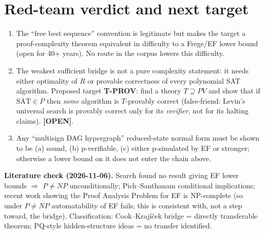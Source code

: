 \documentclass[11pt]{article}
\newcommand{\status}[1]{\textbf{[#1]}}
\newcommand{\SAT}{\mathrm{SAT}}
\begin{document}
\section{Red-team verdict and next target}
\begin{enumerate}
\item The ``free best sequence'' convention is legitimate but makes the target a proof-complexity theorem equivalent in difficulty to a Frege/EF lower bound (open for 40+ years). No route in the corpus lowers this difficulty.
\item The weakest sufficient bridge is not a pure complexity statement: it needs either optimality of $R$ or provable correctness of every polynomial SAT algorithm. Proposed target \textbf{T-PROV}: find a theory $T\supseteq PV$ and show that if $\SAT\in P$ then \emph{some} algorithm is $T$-provably correct (false-friend: Levin's universal search is provably correct only for its \emph{verifier}, not for its halting claims). \status{OPEN}.
\item Any ``multisign DAG hypergraph'' reduced-state normal form must be shown to be (a) sound, (b) p-verifiable, (c) either p-simulated by EF or stronger; otherwise a lower bound on it does not enter the chain above.
\end{enumerate}
\textbf{Literature check (2026-11-06).} Search found no result giving EF lower bounds $\Rightarrow$ $P\ne NP$ unconditionally; Pich--Santhanam conditional implications; recent work showing the Proof Analysis Problem for EF is NP-complete (so under $P\ne NP$ automatability of EF fails; this is consistent with, not a step toward, the bridge). Classification: Cook--Krajíček bridge = directly transferable theorem; PQ-style hidden-structure ideas = no transfer identified.
\end{document}
